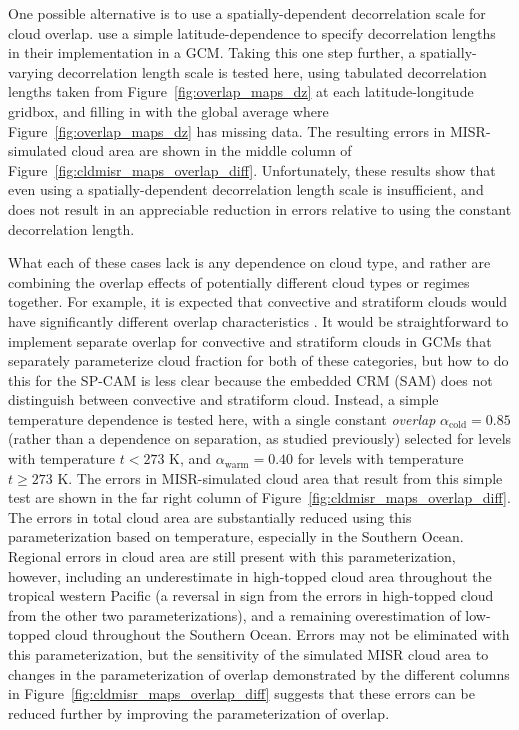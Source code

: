 One possible alternative is to use a spatially-dependent decorrelation
scale for cloud overlap. \citep{oreopoulos_et_al_2012} use a simple
latitude-dependence to specify decorrelation lengths in their
implementation in a GCM. Taking this one step further, a
spatially-varying decorrelation length scale is tested here, using
tabulated decorrelation lengths taken from
Figure~\ref{fig:overlap_maps_dz} at each latitude-longitude gridbox, and
filling in with the global average where
Figure~\ref{fig:overlap_maps_dz} has missing data. The resulting errors
in MISR-simulated cloud area are shown in the middle column of
Figure~\ref{fig:cldmisr_maps_overlap_diff}. Unfortunately, these results
show that even using a spatially-dependent decorrelation length scale is
insufficient, and does not result in an appreciable reduction in errors
relative to using the constant decorrelation length.

What each of these cases lack is any dependence on cloud type, and
rather are combining the overlap effects of potentially different cloud
types or regimes together. For example, it is expected that convective
and stratiform clouds would have significantly different overlap
characteristics \citep[e.g.,][]{pincus_et_al_2005}. It would be
straightforward to implement separate overlap for convective and
stratiform clouds in GCMs that separately parameterize cloud fraction
for both of these categories, but how to do this for the SP-CAM is less
clear because the embedded CRM (SAM) does not distinguish between
convective and stratiform cloud. Instead, a simple temperature
dependence is tested here, with a single constant \emph{overlap}
\(\alpha_\textrm{cold} = 0.85\) (rather than a dependence on separation,
as studied previously) selected for levels with temperature \(t < 273\)
K, and \(\alpha_\textrm{warm} = 0.40\) for levels with temperature
\(t \ge 273\) K. The errors in MISR-simulated cloud area that result
from this simple test are shown in the far right column of
Figure~\ref{fig:cldmisr_maps_overlap_diff}. The errors in total cloud
area are substantially reduced using this parameterization based on
temperature, especially in the Southern Ocean. Regional errors in cloud
area are still present with this parameterization, however, including an
underestimate in high-topped cloud area throughout the tropical western
Pacific (a reversal in sign from the errors in high-topped cloud from
the other two parameterizations), and a remaining overestimation of
low-topped cloud throughout the Southern Ocean. Errors may not be
eliminated with this parameterization, but the sensitivity of the
simulated MISR cloud area to changes in the parameterization of overlap
demonstrated by the different columns in
Figure~\ref{fig:cldmisr_maps_overlap_diff} suggests that these errors
can be reduced further by improving the parameterization of overlap.

